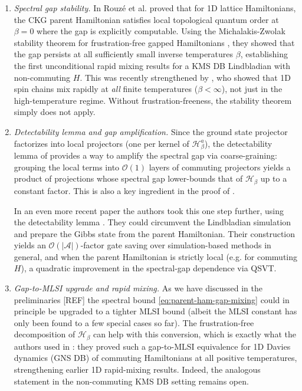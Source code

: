\begin{enumerate}
    \item \emph{Spectral gap stability.} In \cite{rouze2025efficient} Rouzé et al. proved that for 1D lattice Hamiltonians, the CKG parent Hamiltonian satisfies local topological quantum order at $\beta = 0$ where the gap is explicitly computable. Using the Michalakis-Zwolak stability theorem for frustration-free gapped Hamiltonians \cite{michalakis2013stability}, they showed that the gap persists at all sufficiently small inverse temperatures $\beta$, establishing the first unconditional rapid mixing results for a KMS DB Lindbladian with non-commuting $H$. This was recently strengthened by \cite{bergamaschi2024quantum}, who showed that 1D spin chains mix rapidly at \emph{all} finite temperatures ($\beta < \infty$), not just in the high-temperature regime. Without frustration-freeness, the stability theorem simply does not apply.
    \item \emph{Detectability lemma and gap amplification.} Since the ground state projector factorizes into local projectors (one per kernel of $\mathcal{H}_\beta^a$), the detectability lemma of \cite{anshu2016simple} provides a way to amplify the spectral gap via coarse-graining: grouping the local terms into $\mathcal{O}(1)$ layers of commuting projectors yields a product of projections whose spectral gap lower-bounds that of $\mathcal{H}_\beta$ up to a constant factor. This is also a key ingredient in the proof of \cite{rouze2025efficient}.

    In an even more recent paper \cite{fang2026quantum} the authors took this one step further, using the detectability lemma \cite{aharonov2009detectability,anshu2016simple}. They could circumvent the Lindbladian simulation and prepare the Gibbs state from the parent Hamiltonian. Their construction yields an $\mathcal{O}(|\mathcal{A}|)$-factor gate saving over simulation-based methods in general, and when the parent Hamiltonian is strictly local (e.g. for commuting $H$), a quadratic improvement in the spectral-gap dependence via QSVT. 

    \item \emph{Gap-to-MLSI upgrade and rapid mixing.} As we have discussed in the preliminaries [REF] the spectral bound \eqref{eq:parent-ham-gap-mixing} could in principle be upgraded to a tighter MLSI bound (albeit the MLSI constant has only been found to a few special cases so far). The frustration-free decomposition of $\mathcal{H}_\beta$ can help with this conversion, which is exactly what the authors used in \cite{kochanowski2025rapid}: they proved such a gap-to-MLSI equivalence for 1D Davies dynamics (GNS DB) of commuting Hamiltonians at all positive temperatures, strengthening earlier 1D rapid-mixing results. Indeed, the analogous statement in the non-commuting KMS DB setting remains open.
\end{enumerate}

